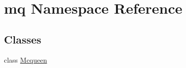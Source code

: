 \hypertarget{namespacemq}{}\section{mq Namespace Reference}
\label{namespacemq}
\subsection*{Classes}
\begin{DoxyCompactItemize}
\item 
class \mbox{\hyperlink{classmq_1_1Mcqueen}{Mcqueen}}
\end{DoxyCompactItemize}
